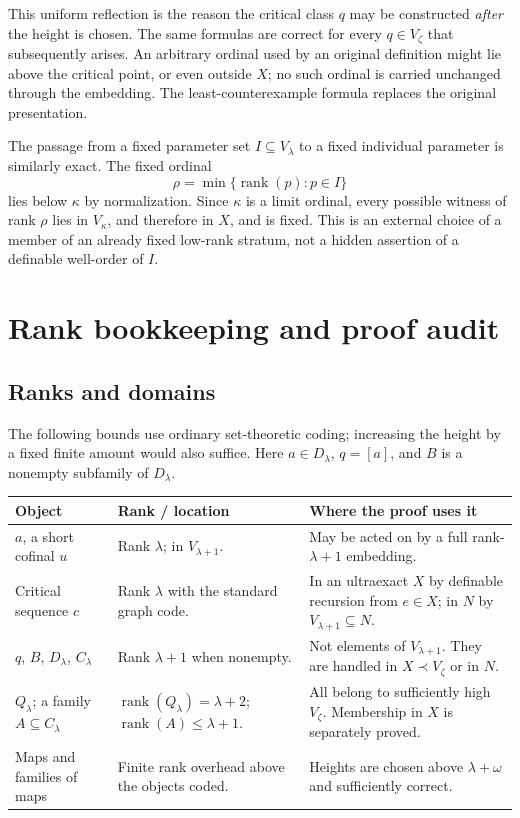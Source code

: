 \documentclass[11pt,letterpaper]{article}
\theoremstyle{definition}
\numberwithin{equation}{section}
\newcommand{\rank}{\operatorname{rank}}
\newcommand{\D}{D_\lambda}
\newcommand{\Q}{Q_\lambda}
\newcommand{\C}{C_\lambda}
\begin{document}
This uniform reflection is the reason the critical class $q$ may be constructed \emph{after} the height is chosen. The same formulas are correct for every $q\in V_\zeta$ that subsequently arises. An arbitrary ordinal used by an original definition might lie above the critical point, or even outside $X$; no such ordinal is carried unchanged through the embedding. The least-counterexample formula replaces the original presentation.

The passage from a fixed parameter set $I\subseteq V_\lambda$ to a fixed individual parameter is similarly exact. The fixed ordinal
\[
\rho=\min\{\rank(p):p\in I\}
\]
lies below $\kappa$ by normalization. Since $\kappa$ is a limit ordinal, every possible witness of rank $\rho$ lies in $V_\kappa$, and therefore in $X$, and is fixed. This is an external choice of a member of an already fixed low-rank stratum, not a hidden assertion of a definable well-order of $I$.

\section{Rank bookkeeping and proof audit}\label{app:audit}

\subsection{Ranks and domains}

The following bounds use ordinary set-theoretic coding; increasing the height by a fixed finite amount would also suffice. Here $a\in\D$, $q=[a]$, and $B$ is a nonempty subfamily of $\D$.

\begin{center}
\begin{tabularx}{\textwidth}{@{}P{.22\textwidth}P{.22\textwidth}Y@{}}
\toprule
\textbf{Object} & \textbf{Rank / location} & \textbf{Where the proof uses it}\\
\midrule
$a$, a short cofinal $u$ & Rank $\lambda$; in $V_{\lambda+1}$. & May be acted on by a full rank-$\lambda+1$ embedding.\\[3pt]
Critical sequence $c$ & Rank $\lambda$ with the standard graph code. & In an ultraexact $X$ by definable recursion from $e\in X$; in $N$ by $V_{\lambda+1}\subseteq N$.\\[3pt]
$q$, $B$, $\D$, $\C$ & Rank $\lambda+1$ when nonempty. & Not elements of $V_{\lambda+1}$. They are handled in $X\prec V_\zeta$ or in $N$.\\[3pt]
$\Q$; a family $A\subseteq\C$ & $\rank(\Q)=\lambda+2$; $\rank(A)\le\lambda+1$. & All belong to sufficiently high $V_\zeta$. Membership in $X$ is separately proved.\\[3pt]
Maps and families of maps & Finite rank overhead above the objects coded. & Heights are chosen above $\lambda+\omega$ and sufficiently correct.\\
\bottomrule
\end{tabularx}
\end{center}
\end{document}
